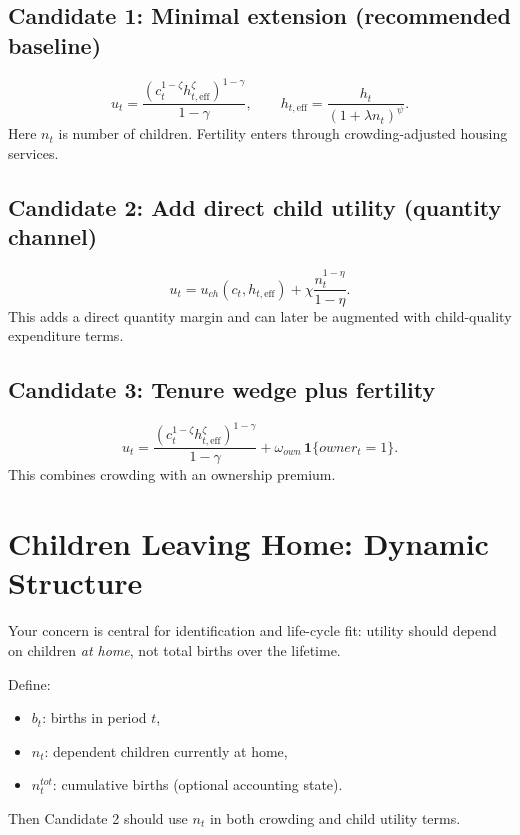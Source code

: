\documentclass[11pt]{article}
\begin{document}
\subsection*{Candidate 1: Minimal extension (recommended baseline)}
\begin{equation}
u_t = \frac{\left(c_t^{1-\zeta} h_{t,\text{eff}}^{\zeta}\right)^{1-\gamma}}{1-\gamma},
\qquad
h_{t,\text{eff}} = \frac{h_t}{(1+\lambda n_t)^{\psi}}.
\end{equation}
Here \(n_t\) is number of children. Fertility enters through crowding-adjusted housing services.

\subsection*{Candidate 2: Add direct child utility (quantity channel)}
\begin{equation}
u_t = u_{ch}(c_t,h_{t,\text{eff}}) + \chi\frac{n_t^{1-\eta}}{1-\eta}.
\end{equation}
This adds a direct quantity margin and can later be augmented with child-quality expenditure terms.

\subsection*{Candidate 3: Tenure wedge plus fertility}
\begin{equation}
u_t = \frac{\left(c_t^{1-\zeta} h_{t,\text{eff}}^{\zeta}\right)^{1-\gamma}}{1-\gamma} + \omega_{own}\,\mathbf{1}\{owner_t=1\}.
\end{equation}
This combines crowding with an ownership premium.

\section{Children Leaving Home: Dynamic Structure}
Your concern is central for identification and life-cycle fit: utility should depend on children \emph{at home}, not total births over the lifetime.

Define:
\begin{itemize}
\item \(b_t\): births in period \(t\),
\item \(n_t\): dependent children currently at home,
\item \(n_t^{tot}\): cumulative births (optional accounting state).
\end{itemize}

Then Candidate 2 should use \(n_t\) in both crowding and child utility terms.
\end{document}
